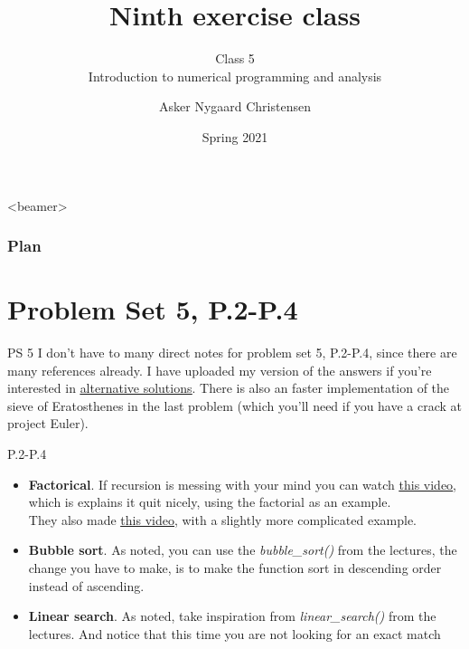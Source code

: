 \documentclass[10pt,danish,t,10pt]{beamer}
\title{Ninth exercise class \vspace{-2mm}}
\subtitle{Class 5 \\Introduction to numerical programming and analysis \vspace{-4mm} }
\author{Asker Nygaard Christensen}
\date{Spring 2021}
\makeatletter
\let\origtableofcontents=\tableofcontents
\def\tableofcontents{\@ifnextchar[{\origtableofcontents}{\gobbletableofcontents}}
\def\gobbletableofcontents#1{\origtableofcontents}
\newcommand{\code}[1]{\textit{#1}} %
\makeatother
\begin{document}
{
\begin{frame}

\maketitle


\end{frame}
}

\addtocounter{framenumber}{-1}

\begin{frame}<beamer>
\frametitle{Plan}

\tableofcontents[]
\end{frame}


\section{Problem Set 5, P.2-P.4}
\begin{frame}{PS 5}
I don't have to many direct notes for problem set 5, P.2-P.4, since there are many references already.
I have uploaded my version of the answers if you're interested in \href{https://github.com/AskerNC/exercises-2021}{\underline{alternative solutions}}. There is also an faster implementation of the sieve of Eratosthenes in the last problem (which you'll need if you have a crack at project Euler). 
\end{frame}
\begin{frame}{P.2-P.4}

\begin{itemize}
    \item[P.2] \textbf{Factorical}. If recursion is messing with your mind you can watch \href{https://www.youtube.com/watch?v=Mv9NEXX1VHc}{\underline{this video}}, which is explains it quit nicely, using the factorial as an example. \\
    They also made \href{https://www.youtube.com/watch?v=8lhxIOAfDss}{\underline{this video}}, with a slightly more complicated example. 
    \item[P.3] \textbf{Bubble sort}. As noted, you can use the \code{bubble\_sort()} from the lectures, the change you have to make, is to make the function sort in descending order instead of ascending.
    \item[P.4] \textbf{Linear search}. As noted, take inspiration from \code{linear\_search()} from the lectures. And notice that this time you are not looking for an exact match
\end{itemize}
\end{frame}
\end{document}
